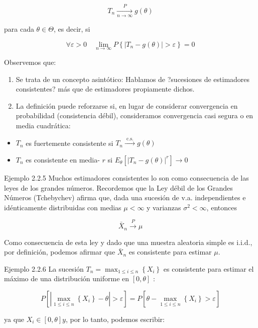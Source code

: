 \documentclass[
]{article}
\providecommand{\tightlist}{%
  \setlength{\itemsep}{0pt}\setlength{\parskip}{0pt}}
\begin{document}
\[
T_{n} \xrightarrow[n \rightarrow \infty]{P} g(\theta)
\]

para cada \(\theta \in \Theta\), es decir, si

\[
\forall \varepsilon>0 \quad \lim _{n \rightarrow \infty} P\left\{\left|T_{n}-g(\theta)\right|>\varepsilon\right\}=0
\]

Observemos que:

\begin{enumerate}
\def\labelenumi{\arabic{enumi}.}
\tightlist
\item
  Se trata de un concepto asintótico: Hablamos de ?sucesiones de estimadores consistentes? más que de estimadores propiamente dichos.
\item
  La definición puede reforzarse si, en lugar de considerar convergencia en probabilidad (consistencia débil), consideramos convergencia casi segura o en media cuadrática:
\end{enumerate}

\begin{itemize}
\tightlist
\item
  \(T_{n}\) es fuertemente consistente si \(T_{n} \xrightarrow{\text { c.s. }} g(\theta)\)
\item
  \(T_{n}\) es consistente en media- \(r\) si \(E_{\theta}\left[\left|T_{n}-g(\theta)\right|^{r}\right] \longrightarrow 0\)
\end{itemize}

Ejemplo 2.2.5 Muchos estimadores consistentes lo son como consecuencia de las leyes de los grandes números. Recordemos que la Ley débil de los Grandes Números (Tchebychev) afirma que, dada una sucesión de v.a. independientes e idénticamente distribuidas con medias \(\mu<\infty\) y varianzas \(\sigma^{2}<\infty\), entonces

\[
\bar{X}_{n} \xrightarrow{P} \mu
\]

Como consecuencia de esta ley y dado que una muestra aleatoria simple es i.i.d., por definición, podemos afirmar que \(\bar{X}_{n}\) es consistente para estimar \(\mu\).

Ejemplo 2.2.6 La sucesión \(T_{n}=\max _{1 \leq i \leq n}\left\{X_{i}\right\}\) es consistente para estimar el máximo de una distribución uniforme en \([0, \theta]\) :

\[
P\left[\left|\max _{1 \leq i \leq n}\left\{X_{i}\right\}-\theta\right|>\varepsilon\right]=P\left[\theta-\max _{1 \leq i \leq n}\left\{X_{i}\right\}>\varepsilon\right]
\]

ya que \(X_{i} \in[0, \theta] y\), por lo tanto, podemos escribir:
\end{document}
